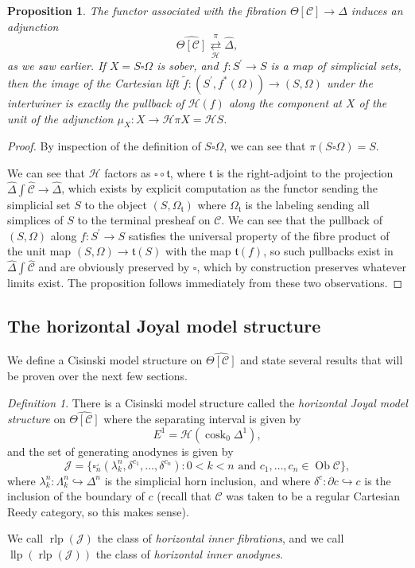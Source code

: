 \documentclass[leqno]{article}
\numberwithin{equation}{subsection}
\theoremstyle{plain}   %
\newtheorem{prop}[equation]{Proposition}
\theoremstyle{remark}
\newtheorem{defn}[equation]{Definition}
\theoremstyle{plain}
\DeclareMathOperator{\Ob}{Ob}
\newcommand{\psh}[1]{\ensuremath{\widehat{#1}}}
\providecommand{\C}{}
\renewcommand{\C}{\ensuremath{\mathcal{C}}}
\newcommand{\cellset}{\ensuremath{\widehat{\Theta[\mathcal{C}]}}}
\newcommand{\ssetlab}{\ensuremath{\widehat{\Delta} \int \widehat{\mathcal{C}}}}
\begin{document}
\begin{prop}\label{pullbacksober}
	The functor associated with the fibration \(\Theta[\C]\to \Delta\) induces an adjunction 
	\[\cellset \underset{\mathscr{H}}{\overset{\pi}{\rightleftarrows}} \psh{\Delta} ,\]
	as we saw earlier. If \(X=S\square\Omega\) is sober, and \(f:S^\prime\to S\) is a map of simplicial sets, then the image of the Cartesian lift \(\tilde{f}:(S^\prime, f^\ast(\Omega))\to (S,\Omega)\) under the intertwiner is exactly the pullback of \(\mathscr{H}(f)\) along the component at \(X\) of the unit of the adjunction \(\mu_X:X\to \mathscr{H}\pi X= \mathscr{H} S\).
\end{prop}
\begin{proof} 
	By inspection of the definition of \(S\square\Omega\), we can see that \(\pi(S\square\Omega)=S\).

	We can see that \(\mathscr{H}\) factors as \(\square\circ \mathfrak{t}\), where \(\mathfrak{t}\) is the right-adjoint to the projection \(\ssetlab\to \psh{\Delta}\), which exists by explicit computation as the functor sending the simplicial set \(S\) to the object \((S,\Omega_{\mathfrak{t}})\) where \(\Omega_{\mathfrak{t}}\) is the labeling sending all simplices of \(S\) to the terminal presheaf on \(\C\).   We can see that the pullback of \((S,\Omega)\) along \(f:S^\prime\to S\) satisfies the universal property of the fibre product of the unit map \((S,\Omega)\to \mathfrak{t}(S)\) with the map \(\mathfrak{t}(f)\), so such pullbacks exist in \(\ssetlab\) and are obviously preserved by \(\square\), which by construction preserves whatever limits exist. The proposition follows immediately from these two observations.
\end{proof}


\subsection{The horizontal Joyal model structure}
We define a Cisinski model structure on \(\cellset\) and state several results that will be proven over the next few sections.

\begin{defn}
	There is a Cisinski model structure called the \emph{horizontal Joyal model structure} on \(\cellset\) where the separating interval is given by 
	\[E^1=\mathscr{H}(\operatorname{cosk}_0 \Delta^1),\]
	and the set of generating anodynes is given by
	\[\mathscr{J}=\{\square_n^\lrcorner(\lambda^n_k,\delta^{c_1},\dots,\delta^{c_n}) : 0<k<n \text{ and } c_1,\dots,c_n \in \Ob \C\},\]
	where \(\lambda^n_k:\Lambda^n_k\hookrightarrow \Delta^n\) is the simplicial horn inclusion, and where \(\delta^c:\partial c \hookrightarrow c\) is the inclusion of the boundary of \(c\) (recall that \(\C\) was taken to be a regular Cartesian Reedy category, so this makes sense).

	We call \(\operatorname{rlp}(\mathscr{J})\) the class of \emph{horizontal inner fibrations}, and we call \(\operatorname{llp}(\operatorname{rlp}(\mathscr{J}))\) the class of \emph{horizontal inner anodynes}.
\end{defn}
\end{document}
